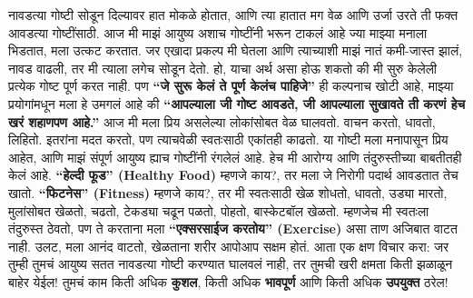नावडत्या गोष्टी सोडून दिल्यावर हात मोकळे होतात, आणि त्या हातात मग वेळ आणि उर्जा उरते ती फक्त आवडत्या गोष्टींसाठी. आज मी माझं आयुष्य अशाच गोष्टींनी भरून टाकलं आहे ज्या माझ्या मनाला भिडतात, मला उत्कट करतात. जर एखादा प्रकल्प मी घेतला आणि त्याच्याशी माझं नातं कमी-जास्त झालं, नावड वाढली, तर मी त्याला लगेच सोडून देतो. हो, याचा अर्थ असा होऊ शकतो की मी सुरु केलेली प्रत्येक गोष्ट पूर्ण करत नाही. पण \textbf{“जे सुरू केलं ते पूर्ण केलंच पाहिजे”} ही कल्पनाच खोटी आहे, माझ्या प्रयोगांमधून मला हे उमगलं आहे की \textbf{“आपल्याला जी गोष्ट आवडते, जी आपल्याला सुखावते ती करणं हेच खरं शहाणपण आहे.”}
आज मी मला प्रिय असलेल्या लोकांसोबत वेळ घालवतो. वाचन करतो, धावतो, लिहितो. इतरांना मदत करतो, पण त्याचवेळी स्वतःसाठी एकांतही काढतो. या गोष्टी मला मनापासून प्रिय आहेत, आणि माझं संपूर्ण आयुष्य ह्याच गोष्टींनी रंगलेलं आहे.
हेच मी आरोग्य आणि तंदुरुस्तीच्या बाबतीतही केलं आहे. \textbf{“हेल्दी फूड” (Healthy Food)} म्हणजे काय?, तर मला जे निरोगी पदार्थ आवडतात तेच खातो. \textbf{“फिटनेस” (Fitness)} म्हणजे काय?, तर मी स्वतःसाठी खेळ शोधतो, धावतो, उड्या मारतो, मुलांसोबत खेळतो, चढतो, टेकड्या चढून पळतो, पोहतो, बास्केटबॉल खेळतो. म्हणजेच मी स्वतःला तंदुरुस्त ठेवतो, पण ते करताना मला \textbf{“एक्सरसाईज करतोय” (Exercise)} असा ताण अजिबात वाटत नाही. उलट, मला आनंद वाटतो, खेळताना शरीर आपोआप सक्षम होतं.
आता एक क्षण विचार करा: जर तुम्ही तुमचं आयुष्य सतत नावडत्या गोष्टी करण्यात घालवलं नाही, तर तुमची खरी क्षमता किती झळाळून बाहेर येईल! तुमचं काम किती अधिक \textbf{कुशल}, किती अधिक \textbf{भावपूर्ण} आणि किती अधिक \textbf{उपयुक्त} ठरेल!
